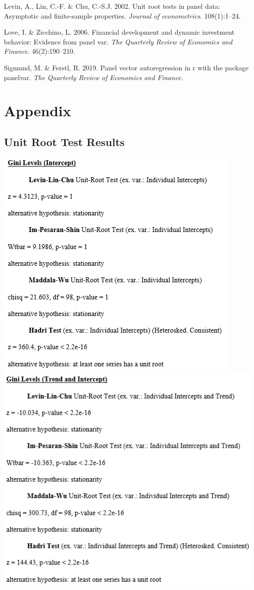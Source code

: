 \documentclass[11pt,preprint, authoryear]{elsarticle}
\numberwithin{equation}{section}
\numberwithin{figure}{section}
\numberwithin{table}{section}
\begin{document}
\leavevmode\hypertarget{ref-levin}{}%
Levin, A., Lin, C.-F. \& Chu, C.-S.J. 2002. Unit root tests in panel
data: Asymptotic and finite-sample properties. \emph{Journal of
econometrics}. 108(1):1--24.

\leavevmode\hypertarget{ref-love}{}%
Love, I. \& Zicchino, L. 2006. Financial development and dynamic
investment behavior: Evidence from panel var. \emph{The Quarterly Review
of Economics and Finance}. 46(2):190--210.

\leavevmode\hypertarget{ref-sigmund2019panel}{}%
Sigmund, M. \& Ferstl, R. 2019. Panel vector autoregression in r with
the package panelvar. \emph{The Quarterly Review of Economics and
Finance}.

\newpage

\hypertarget{appendix}{%
\section*{Appendix}\label{appendix}}

\hypertarget{unit-root-test-results}{%
\subsection{\texorpdfstring{Unit Root Test Results
\label{A}}{Unit Root Test Results }}\label{unit-root-test-results}}

\begin{center}\includegraphics[width=0.49\linewidth,height=0.35\textheight]{images/Gini_Levels_Intercept} \includegraphics[width=0.49\linewidth,height=0.35\textheight]{images/Gini_Levels_Trend} \end{center}
\end{document}
